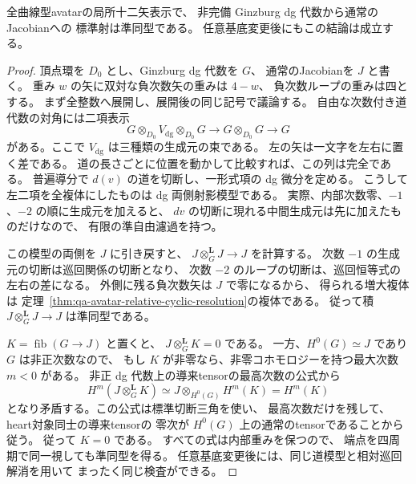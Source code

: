 \begin{corollary}
\label{cor:qa-avatar-ginzburg-formal}
全曲線型avatarの局所十二矢表示で、
非完備 Ginzburg dg 代数から通常のJacobianへの
標準射は準同型である。
任意基底変更後にもこの結論は成立する。
\end{corollary}
\begin{proof}
頂点環を $D_0$ とし、Ginzburg dg 代数を $G$、
通常のJacobianを $J$ と書く。
重み $w$ の矢に双対な負次数矢の重みは $4-w$、
負次数ループの重みは四とする。
まず全整数へ展開し、展開後の同じ記号で議論する。
自由な次数付き道代数の対角には二項表示
\[
 G\otimes_{D_0}V_{\mathrm{dg}}\otimes_{D_0}G
 \longrightarrow G\otimes_{D_0}G\longrightarrow G
\]
がある。ここで $V_{\mathrm{dg}}$ は三種類の生成元の束である。
左の矢は一文字を左右に置く差である。
道の長さごとに位置を動かして比較すれば、この列は完全である。
普遍導分で $d(v)$ の道を切断し、一形式項の dg 微分を定める。
こうして左二項を全複体にしたものは dg 両側射影模型である。
実際、内部次数零、$-1$、$-2$ の順に生成元を加えると、
$dv$ の切断に現れる中間生成元は先に加えたものだけなので、
有限の準自由濾過を持つ。

この模型の両側を $J$ に引き戻すと、
$J\otimes_G^{\mathbf L}J\to J$ を計算する。
次数 $-1$ の生成元の切断は巡回関係の切断となり、
次数 $-2$ のループの切断は、巡回恒等式の左右の差になる。
外側に残る負次数矢は $J$ で零になるから、
得られる増大複体は
定理~\ref{thm:qa-avatar-relative-cyclic-resolution}の複体である。
従って積 $J\otimes_G^{\mathbf L}J\to J$ は準同型である。

$K=\operatorname{fib}(G\to J)$ と置くと、
$J\otimes_G^{\mathbf L}K=0$ である。
一方、$H^0(G)\simeq J$ であり $G$ は非正次数なので、
もし $K$ が非零なら、非零コホモロジーを持つ最大次数 $m<0$ がある。
非正 dg 代数上の導来tensorの最高次数の公式から
\[
 H^m(J\otimes_G^{\mathbf L}K)
       \simeq J\otimes_{H^0(G)}H^m(K)=H^m(K)
\]
となり矛盾する。この公式は標準切断三角を使い、
最高次数だけを残して、heart対象同士の導来tensorの
零次が $H^0(G)$ 上の通常のtensorであることから従う。
従って $K=0$ である。
すべての式は内部重みを保つので、
端点を四周期で同一視しても準同型を得る。
任意基底変更後には、同じ道模型と相対巡回解消を用いて
まったく同じ検査ができる。
\end{proof}

